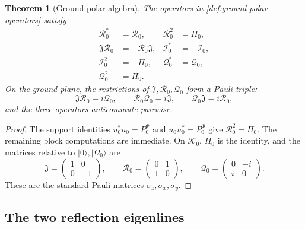 \documentclass[11pt,reqno]{scrartcl}
\newcommand{\fundJ}{\mathfrak J}
\newcommand{\PzeroP}{P_{0}^{\Psi}}
\newcommand{\PzeroF}{P_{0}^{\Phi}}
\newcommand{\Kzero}{\mathscr K_{0}}
\newcommand{\Pizero}{\Pi_{0}}
\newcommand{\uzero}{u_{0}}
\newcommand{\Rzero}{\mathcal R_{0}}
\newcommand{\Izero}{\mathcal I_{0}}
\newcommand{\Qzero}{\mathcal Q_{0}}
\newcommand{\ket}[1]{\lvert #1\rangle}
\theoremstyle{plain}
\newtheorem{theorem}{Theorem}[section]
\theoremstyle{definition}
\theoremstyle{remark}
\begin{document}
\begin{theorem}[Ground polar algebra]
\label{thm:ground-polar-algebra}
The operators in \cref{def:ground-polar-operators} satisfy
\begin{align}
  \Rzero^*&=\Rzero,
  &\Rzero^2&=\Pizero,
  \label{eq:R0-properties}\\
  \fundJ\Rzero&=-\Rzero\fundJ,
  &\Izero^*&=-\Izero,
  \label{eq:J-R0-anticommute}\\
  \Izero^2&=-\Pizero,
  &\Qzero^*&=\Qzero,
  \label{eq:I0-Q0-properties}\\
  \Qzero^2&=\Pizero.
  \label{eq:Q0-square}
\end{align}
On the ground plane, the restrictions of
\(\fundJ,\Rzero,\Qzero\) form a Pauli triple:
\begin{equation}
  \fundJ\Rzero=i\Qzero,
  \qquad
  \Rzero\Qzero=i\fundJ,
  \qquad
  \Qzero\fundJ=i\Rzero,
  \label{eq:ground-Pauli-products}
\end{equation}
and the three operators anticommute pairwise.
\end{theorem}

\begin{proof}
The support identities \(\uzero^*\uzero=\PzeroP\) and
\(\uzero\uzero^*=\PzeroF\) give
\(\Rzero^2=\Pizero\).  The remaining block computations are immediate.
On \(\Kzero\), \(\Pizero\) is the identity, and the matrices relative to
\(\ket0,\ket{\Omega_0}\) are
\begin{equation}
  \fundJ=\begin{pmatrix}1&0\\0&-1\end{pmatrix},
  \qquad
  \Rzero=\begin{pmatrix}0&1\\1&0\end{pmatrix},
  \qquad
  \Qzero=\begin{pmatrix}0&-i\\i&0\end{pmatrix}.
\end{equation}
These are the standard Pauli matrices \(\sigma_z,\sigma_x,\sigma_y\).
\end{proof}

\subsection{The two reflection eigenlines}
\end{document}
